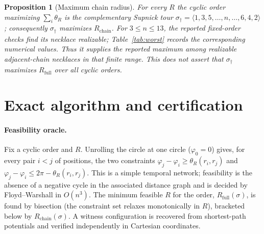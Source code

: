 \documentclass[11pt]{article}
\newtheorem{proposition}[theorem]{Proposition}
\theoremstyle{definition}
\theoremstyle{remark}
\begin{document}
\begin{proposition}[Maximum chain radius]\label{prop:worst}
For every $R$ the cyclic order maximizing $\sum_i\theta_R$ is the complementary Supnick tour $\sigma_\dagger=\langle1,3,5,\dots,n,\dots,6,4,2\rangle$; consequently $\sigma_\dagger$ maximizes $R_{\mathrm{chain}}$. For $3\le n\le13$, the reported fixed-order checks find its necklace realizable; Table~\ref{tab:worst} records the corresponding numerical values. Thus it supplies the reported maximum among realizable adjacent-chain necklaces in that finite range. This does not assert that $\sigma_\dagger$ maximizes $R_{\mathrm{full}}$ over all cyclic orders.
\end{proposition}

\section{Exact algorithm and certification}\label{sec:algo}

\paragraph{Feasibility oracle.} Fix a cyclic order and $R$. Unrolling the circle at one circle ($\varphi_0=0$) gives, for every pair $i<j$ of positions, the two constraints $\varphi_j-\varphi_i\ge\theta_R(r_i,r_j)$ and $\varphi_j-\varphi_i\le2\pi-\theta_R(r_i,r_j)$. This is a simple temporal network; feasibility is the absence of a negative cycle in the associated distance graph and is decided by Floyd--Warshall in $O(n^3)$. The minimum feasible $R$ for the order, $R_{\mathrm{full}}(\sigma)$, is found by bisection (the constraint set relaxes monotonically in $R$), bracketed below by $R_{\mathrm{chain}}(\sigma)$. A witness configuration is recovered from shortest-path potentials and verified independently in Cartesian coordinates.
\end{document}
